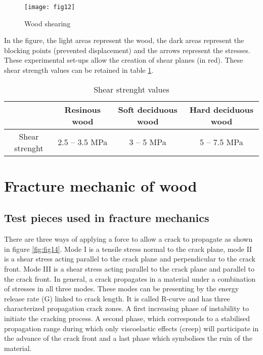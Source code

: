 \begin{figure}[htp]
	\centering
	\texttt{[image: fig12]}
	\caption{Wood shearing}
	\label{fig:fig12}
\end{figure}

In the figure, the light areas represent the wood, the dark areas represent the blocking points (prevented displacement) and the arrows represent the stresses. These experimental set-ups allow the creation of shear planes (in red). These shear strength values can be retained in table \ref{fig:fig13}.

\begin{table} [H]
\centering
\begin{tabular}{cccc}
	\toprule %
	& Resinous wood & Soft deciduous wood & Hard deciduous wood \\\midrule
Shear strenght & 2.5 -- 3.5 \unit{\mega\pascal}
	& 3 -- 5 \unit{\mega\pascal} & 5 -- 7.5 \unit{\mega\pascal}\\
	  \bottomrule %
\end{tabular}
	\caption{Shear strenght values}
	\label{fig:fig13}
\end{table}

%


\section{Fracture mechanic of wood}

\subsection{Test pieces used in fracture mechanics}

There are three ways of applying a force to allow a crack to propagate as shown in figure \ref{fig:fig14}. Mode I is a tensile stress normal to the crack plane, mode II is a shear stress acting parallel to the crack plane and perpendicular to the crack front. Mode III is a shear stress acting parallel to the crack plane and parallel to the crack front. In general, a crack propagates in a material under a combination of stresses in all three modes. These modes can be presenting by the energy release rate (G) linked to crack length. It is called R-curve and has three characterized propagation crack zones. A first increasing phase of instability to initiate the cracking process. A second phase, which corresponds to a stabilised propagation range during which only viscoelastic effects (creep) will participate in the advance of the crack front and a last phase which symbolises the ruin of the material.


